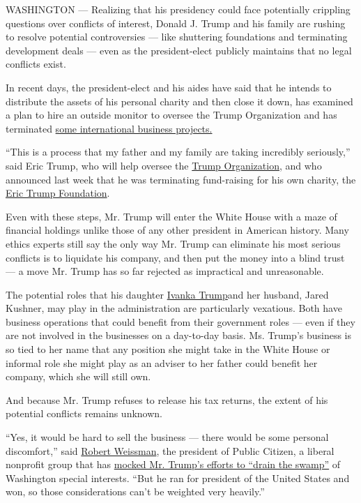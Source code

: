 WASHINGTON --- Realizing that his presidency could face potentially
crippling questions over conflicts of interest, Donald J. Trump and his
family are rushing to resolve potential controversies --- like
shuttering foundations and terminating development deals --- even as the
president-elect publicly maintains that no legal conflicts exist.

In recent days, the president-elect and his aides have said that he
intends to distribute the assets of his personal charity and then close
it down, has examined a plan to hire an outside monitor to oversee the
Trump Organization and has terminated
\href{https://www.nytimes.com/2016/11/15/us/politics/donald-trump-holdings-conflict-of-interest.html?_r=0}{some
international business projects.}

``This is a process that my father and my family are taking incredibly
seriously,'' said Eric Trump, who will help oversee the
\href{http://www.trump.com/}{Trump Organization}, and who announced last
week that he was terminating fund-raising for his own charity, the
\href{https://www.erictrumpfoundation.com/}{Eric Trump Foundation}.

Even with these steps, Mr. Trump will enter the White House with a maze
of financial holdings unlike those of any other president in American
history. Many ethics experts still say the only way Mr. Trump can
eliminate his most serious conflicts is to liquidate his company, and
then put the money into a blind trust --- a move Mr. Trump has so far
rejected as impractical and unreasonable.

The potential roles that his daughter
\href{http://www.nytimes.com/2016/12/03/fashion/ivanka-trump-first-daughter.html?_r=0}{Ivanka
Trump}and her husband, Jared Kushner, may play in the administration are
particularly vexatious. Both have business operations that could benefit
from their government roles --- even if they are not involved in the
businesses on a day-to-day basis. Ms. Trump's business is so tied to her
name that any position she might take in the White House or informal
role she might play as an adviser to her father could benefit her
company, which she will still own.

And because Mr. Trump refuses to release his tax returns, the extent of
his potential conflicts remains unknown.

``Yes, it would be hard to sell the business --- there would be some
personal discomfort,'' said
\href{http://www.citizen.org/Page.aspx?pid=2558}{Robert Weissman}, the
president of Public Citizen, a liberal nonprofit group that has
\href{http://www.citizen.org/pressroom/pressroomredirect.cfm?ID=10095}{mocked
Mr. Trump's efforts to ``drain the swamp''} of Washington special
interests. ``But he ran for president of the United States and won, so
those considerations can't be weighted very heavily.''

